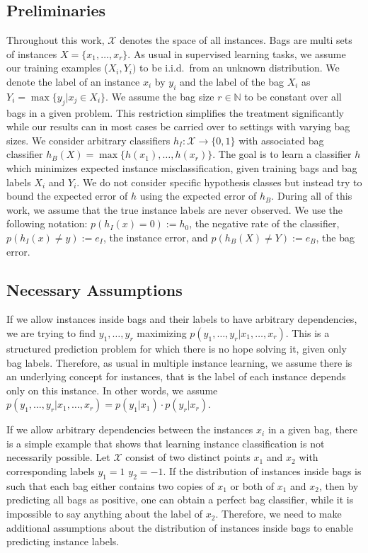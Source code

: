 \subsection{Preliminaries}
Throughout this work, $\mathcal{X}$ denotes the space of all instances. Bags are multi sets of instances $X=\{x_1,\dotsc, x_r\}$.
As usual in supervised learning tasks, we assume our training examples ($X_i,Y_i)$ to be i.i.d.\ from an unknown distribution.
We denote the label of an instance $x_i$ by $y_i$ and the label of the bag $X_i$ as $Y_i = \max\{y_j | x_j \in  X_i\}$.
We assume the bag size $r\in \mathbb{N}$ to be constant over all bags in a given problem. This restriction simplifies the treatment
significantly while our results can in most cases be carried over to settings with varying bag sizes.
We consider arbitrary classifiers $h_I\colon \mathcal{X} \rightarrow \{0, 1\}$ with associated bag classifier
$h_B(X) = \max \{h(x_1),\dotsc,h(x_r)\}$.
The goal is to learn a classifier $h$ which minimizes expected instance misclassification, given training bags and bag labels
$X_i$ and $Y_i$.
We do not consider specific hypothesis classes but instead try to bound the expected error of $h$ using the expected error of $h_B$.
During all of this work, we assume that the true instance labels are never observed.
We use the following notation: $p(h_I(x)=0):= h_0$, the negative rate of the classifier,
$p(h_I(x) \neq y) := e_I$, the instance error, and $p(h_B(X) \neq Y) := e_B$, the bag error.

\subsection{Necessary Assumptions}
If we allow instances inside bags and their labels to have arbitrary dependencies, we are trying to find
$y_1,\dotsc,y_r$ maximizing $p(y_1,\dotsc, y_r | x_1, \dotsc, x_r)$. This is a structured 
prediction problem for which there is no hope solving it, given only bag labels.
Therefore, as usual in multiple instance learning, we assume there is an underlying concept for instances,
that is the label of each instance depends only on this instance.
In other words, we assume $p(y_1,\dotsc, y_r | x_1, \dotsc, x_r)=p(y_1|x_1) \cdot p(y_r|x_r)$.

If we allow arbitrary dependencies between the instances $x_i$ in a given bag, there is a simple example 
\citep{sabato2009homogeneous} that shows that learning instance classification is not necessarily possible.
Let $\mathcal{X}$ consist of two
distinct points $x_1$ and $x_2$ with corresponding labels $y_1 = 1$ $y_2 = -1$. If the distribution
of instances inside bags is such that each bag either contains two copies of $x_1$ or both of $x_1$ and $x_2$, then
by predicting all bags as positive, one can obtain a perfect bag classifier, while it is impossible to say anything
about the label of $x_2$.
Therefore, we need to make additional assumptions about the distribution of instances inside bags to enable
predicting instance labels.

